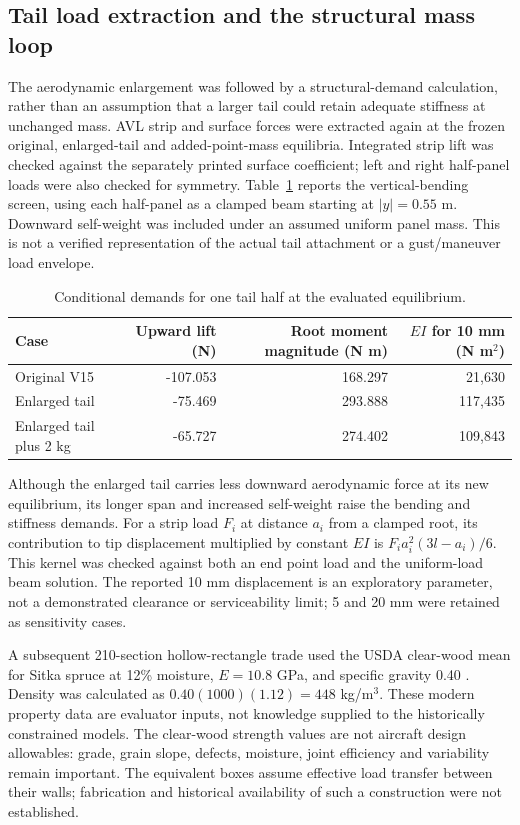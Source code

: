 \subsection{Tail load extraction and the structural mass loop}
\label{sec:tail-structural-loop}

The aerodynamic enlargement was followed by a structural-demand calculation,
rather than an assumption that a larger tail could retain adequate stiffness
at unchanged mass. AVL strip and surface forces were extracted again at the
frozen original, enlarged-tail and added-point-mass equilibria. Integrated
strip lift was checked against the separately printed surface coefficient;
left and right half-panel loads were also checked for symmetry. Table~\ref{tab:tail-beam-demand}
reports the vertical-bending screen, using each half-panel as a clamped beam
starting at $|y|=0.55$ m. Downward self-weight was included under an assumed
uniform panel mass. This is not a verified representation of the actual
tail attachment or a gust/maneuver load envelope.

\begin{table}[htbp]\centering\small
\caption{Conditional demands for one tail half at the evaluated equilibrium.}
\label{tab:tail-beam-demand}
\begin{tabular}{lrrr}\toprule
Case & Upward lift (N) & Root moment magnitude (N m) & $EI$ for 10 mm (N m$^2$)\\\midrule
Original V15 & -107.053 & 168.297 & 21,630\\
Enlarged tail & -75.469 & 293.888 & 117,435\\
Enlarged tail plus 2 kg & -65.727 & 274.402 & 109,843\\\bottomrule
\end{tabular}\end{table}

Although the enlarged tail carries less downward aerodynamic force at its
new equilibrium, its longer span and increased self-weight raise the bending
and stiffness demands. For a strip load $F_i$ at distance $a_i$ from a clamped
root, its contribution to tip displacement multiplied by constant $EI$ is
$F_i a_i^2(3l-a_i)/6$. This kernel was checked against both an end point load
and the uniform-load beam solution. The reported 10 mm displacement is an
exploratory parameter, not a demonstrated clearance or serviceability limit;
5 and 20 mm were retained as sensitivity cases.

A subsequent 210-section hollow-rectangle trade used the USDA clear-wood
mean for Sitka spruce at 12\% moisture, $E=10.8$ GPa, and specific gravity
0.40 \cite{ref46}. Density was calculated as $0.40(1000)(1.12)=448$ kg/m$^3$.
These modern property data are evaluator inputs, not knowledge supplied to the
historically constrained models. The clear-wood strength values are not
aircraft design allowables: grade, grain slope, defects, moisture, joint
efficiency and variability remain important. The equivalent boxes assume
effective load transfer between their walls; fabrication and historical
availability of such a construction were not established.

